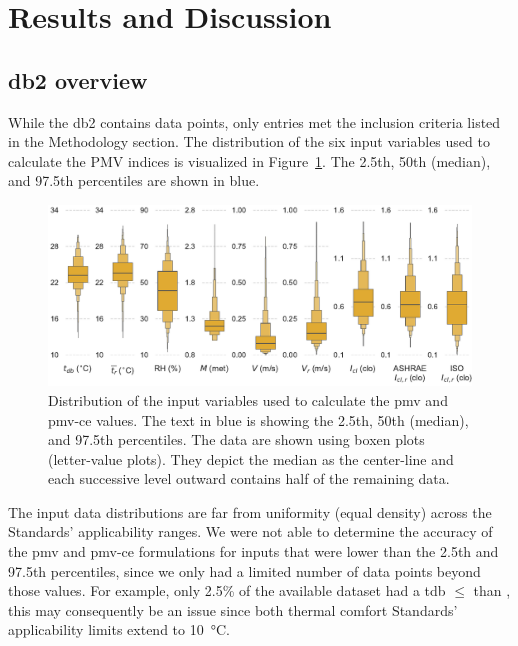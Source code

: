 \section{Results and Discussion}\label{sec:results}

\subsection{\ac{db2} overview}\label{subsec:comfort-db-overview}
While the \ac{db2} contains  data points, only  entries met the inclusion criteria listed in the Methodology section.
The distribution of the six input variables used to calculate the PMV indices is visualized in Figure~\ref{fig:dist_input_data}.
The 2.5th, 50th (median), and 97.5th percentiles are shown in blue.
\begin{figure}[htb!]
    \centering
    \includegraphics[width=\textwidth]{figures/dist_input_data}
    \caption{Distribution of the input variables used to calculate the \ac{pmv} and \ac{pmv-ce} values.
    The text in blue is showing the 2.5th, 50th (median), and 97.5th percentiles.
    The data are shown using boxen plots (letter-value plots).
    They depict the median as the center-line and each successive level outward contains half of the remaining data.}
    \label{fig:dist_input_data}
\end{figure}
The input data distributions are far from uniformity (equal density) across the Standards' applicability ranges.
We were not able to determine the accuracy of the \ac{pmv} and \ac{pmv-ce} formulations for inputs that were lower than the 2.5th and 97.5th percentiles, since we only had a limited number of data points beyond those values.
For example, only 2.5\% of the available dataset had a \ac{tdb} $\leq$ than , this may consequently be an issue since both thermal comfort Standards' applicability limits extend to \qty{10}{\celsius}.
